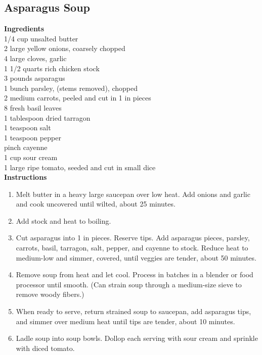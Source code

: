 \documentclass{article}
\numberwithin{figure}{section}
\numberwithin{equation}{section}
\begin{document}
\pagebreak
\subsection{Asparagus Soup}
{\bf Ingredients}\\
1/4 cup unsalted butter\\
2 large yellow onions, coarsely chopped\\
4 large cloves, garlic\\
1 1/2 quarts rich chicken stock\\
3 pounds asparagus\\
1 bunch parsley, (stems removed), chopped\\
2 medium carrots, peeled and cut in 1 in pieces\\
8 fresh basil leaves\\
1 tablespoon dried tarragon\\
1 teaspoon salt\\
1 teaspoon pepper\\
pinch cayenne\\
1 cup sour cream\\
1 large ripe tomato, seeded and cut in small dice\\

{\bf Instructions}
\begin{enumerate}
\item Melt butter in a heavy large saucepan over low heat.  Add onions and garlic and cook uncovered until wilted, about 25 minutes.
\item Add  stock and heat to boiling.
\item Cut asparagus into 1 in pieces.  Reserve tips.  Add asparagus pieces, parsley, carrots, basil, tarragon, salt, pepper, and cayenne to stock.  Reduce heat to medium-low and simmer, covered, until veggies are tender, about 50 minutes.
\item Remove soup from heat and let cool.  Process in batches in a blender or food processor until smooth. (Can strain soup through a medium-size sieve to remove woody fibers.)
\item When ready to serve, return strained soup to saucepan, add asparagus tips, and simmer over medium heat until tips are tender, about 10 minutes.
\item Ladle soup into soup bowls.  Dollop each serving with sour cream and sprinkle with diced tomato.
\end{enumerate}




\pagebreak
\end{document}

